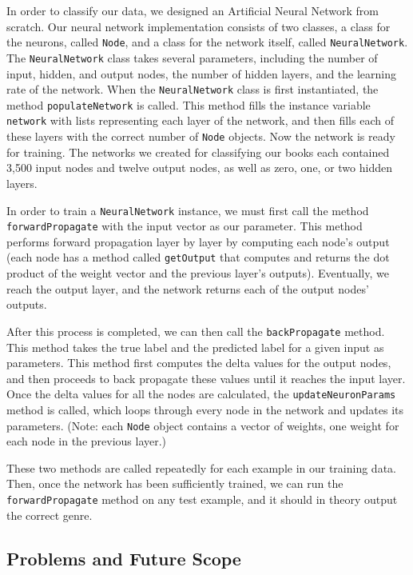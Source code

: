 \documentclass[11pt,letterpaper]{article}
\begin{document}
In order to classify our data, we designed an Artificial Neural Network from scratch. Our neural network implementation consists of two classes, a class for the neurons, called \texttt{Node}, and a class for the network itself, called \texttt{NeuralNetwork}. The \texttt{NeuralNetwork} class takes several parameters, including the number of input, hidden, and output nodes, the number of hidden layers, and the learning rate of the network. When the \texttt{NeuralNetwork} class is first instantiated, the method \texttt{populateNetwork} is called. This method fills the instance variable \texttt{network} with lists representing each layer of the network, and then fills each of these layers with the correct number of \texttt{Node} objects. Now the network is ready for training. The networks we created for classifying our books each contained 3,500 input nodes and twelve output nodes, as well as zero, one, or two hidden layers.

In order to train a \texttt{NeuralNetwork} instance, we must first call the method \texttt{forwardPropagate} with the input vector as our parameter. This method performs forward propagation layer by layer by computing each node's output (each node has a method called \texttt{getOutput} that computes and returns the dot product of the weight vector and the previous layer's outputs). Eventually, we reach the output layer, and the network returns each of the output nodes' outputs.

After this process is completed, we can then call the \texttt{backPropagate} method. This method takes the true label and the predicted label for a given input as parameters. This method first computes the delta values for the output nodes, and then proceeds to back propagate these values until it reaches the input layer. Once the delta values for all the nodes are calculated, the \texttt{updateNeuronParams} method is called, which loops through every node in the network and updates its parameters. (Note: each \texttt{Node} object contains a vector of weights, one weight for each node in the previous layer.)

These two methods are called repeatedly for each example in our training data. Then, once the network has been sufficiently trained, we can run the \texttt{forwardPropagate} method on any test example, and it should in theory output the correct genre.

\subsection{Problems and Future Scope}
\end{document}
